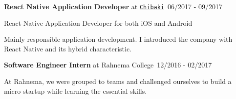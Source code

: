\documentclass[letterpaper]{article}
\renewenvironment{itemize}{
  \begin{list}{}{
    \setlength{\leftmargin}{1.5em}
  }
}{
  \end{list}
}
\begin{document}
\begin{itemize}
\item \textbf{React Native Application Developer} at \href{https://chibaki.co}{\tt Chibaki}{\ \scriptsize 06/2017 - 09/2017}
    \begin{description}[style=nextline,before=\footnotesize]
        {\hspace*{10pt}React-Native Application Developer for both iOS and Android}
    \end{description}
    \begin{description}[style=nextline,before=\normalsize,noitemsep,topsep=0pt]
        \item{\hspace*{8pt} \faCaretRight \hspace*{4pt}Mainly responsible application development. I introduced the company with React Native and its hybrid characteristic.}
    \end{description}

\item \textbf{Software Engineer Intern} at Rahnema College{\ \scriptsize 12/2016 - 02/2017}
    \begin{description}[style=nextline,before=\footnotesize]
        {\hspace*{10pt}At Rahnema, we were grouped to teams and challenged ourselves to build a micro startup while learning the essential skills.}
    \end{description}
\end{itemize}
\end{document}
